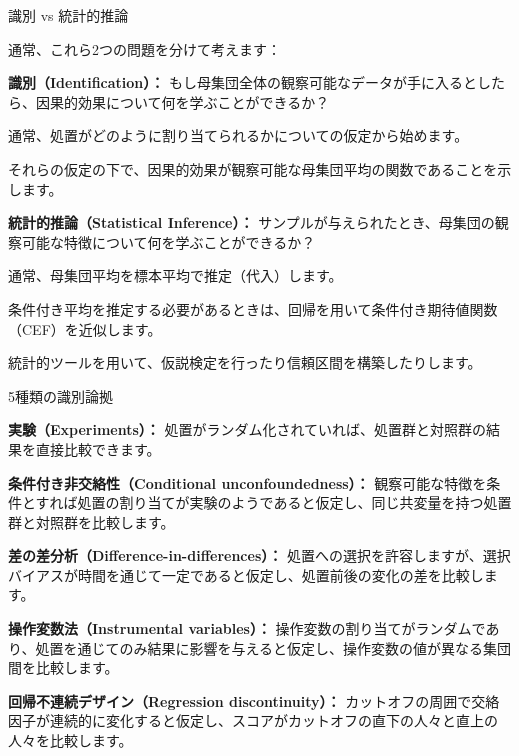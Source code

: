 \documentclass[11pt,handout]{beamer}
\newenvironment{wideitemize}{\itemize\addtolength{\itemsep}{10pt}}{\enditemize}
\begin{document}
\begin{frame}{識別 vs 統計的推論}

通常、これら2つの問題を分けて考えます： \medskip	
	
	\pause 
	
	\begin{wideitemize}
		\item
		\textbf{識別（Identification）：} もし母集団全体の観察可能なデータが手に入るとしたら、因果的効果について何を学ぶことができるか？ 
		\pause
			\begin{wideitemize}
				\item
				通常、処置がどのように割り当てられるかについての仮定から始めます。
				
				\item
				それらの仮定の下で、因果的効果が観察可能な母集団平均の関数であることを示します。
			\end{wideitemize}
		\pause
		\item
		\textbf{統計的推論（Statistical Inference）：} サンプルが与えられたとき、母集団の観察可能な特徴について何を学ぶことができるか？ \pause
			\begin{wideitemize}
				\item
				通常、母集団平均を標本平均で推定（代入）します。
				
				\item
				条件付き平均を推定する必要があるときは、回帰を用いて条件付き期待値関数（CEF）を近似します。
				
				\item
				統計的ツールを用いて、仮説検定を行ったり信頼区間を構築したりします。
			\end{wideitemize}		
	\end{wideitemize}
\end{frame}

\begin{frame}{5種類の識別論拠}
	\begin{wideitemize}
		\item
		\textbf{実験（Experiments）：} 処置がランダム化されていれば、処置群と対照群の結果を直接比較できます。
		
		\pause
		\item
		\textbf{条件付き非交絡性（Conditional unconfoundedness）：} 観察可能な特徴を条件とすれば処置の割り当てが実験のようであると仮定し、同じ共変量を持つ処置群と対照群を比較します。
		
		\pause
		\item
		\textbf{差の差分析（Difference-in-differences）：} 処置への選択を許容しますが、選択バイアスが時間を通じて一定であると仮定し、処置前後の変化の差を比較します。
		
		\pause
		\item
		\textbf{操作変数法（Instrumental variables）：} 操作変数の割り当てがランダムであり、処置を通じてのみ結果に影響を与えると仮定し、操作変数の値が異なる集団間を比較します。
		
		\pause
		\item
		\textbf{回帰不連続デザイン（Regression discontinuity）：} カットオフの周囲で交絡因子が連続的に変化すると仮定し、スコアがカットオフの直下の人々と直上の人々を比較します。
	\end{wideitemize}	
\end{frame}
\end{document}
